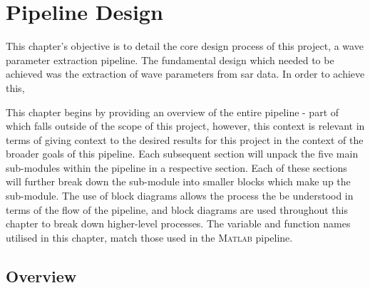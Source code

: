 \chapter{Pipeline Design}
\label{chap:systemDesign}

This chapter's objective is to detail the core design process of this project, a wave parameter extraction pipeline. The fundamental design which needed to be achieved was the extraction of wave parameters from \acs{sar} data. In order to achieve this, 




This chapter begins by providing an overview of the entire pipeline - part of which falls outside of the scope of this project, however, this context is relevant in terms of giving context to the desired results for this project in the context of the broader goals of this pipeline. Each subsequent section will unpack the five main sub-modules within the pipeline in a respective section. Each of these sections will further break down the sub-module into smaller blocks which make up the sub-module. The use of block diagrams allows the process the be understood in terms of the flow of the pipeline, and block diagrams are used throughout this chapter to break down higher-level processes. The variable and function names utilised in this chapter, match those used in the \textsc{Matlab} pipeline.

\section{Overview} \label{sec:systemDesign.overview}

